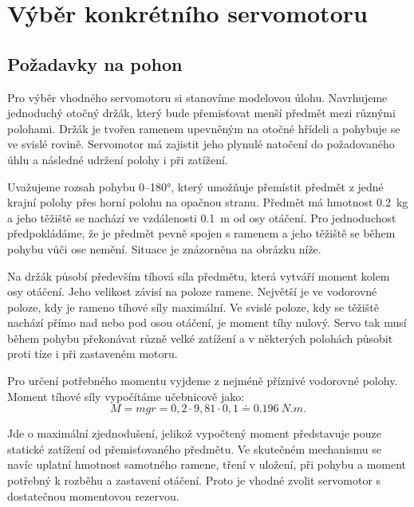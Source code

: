 
\chapter{Výběr konkrétního servomotoru}

\section{Požadavky na pohon}

Pro výběr vhodného servomotoru si stanovíme modelovou úlohu. Navrhujeme jednoduchý otočný držák, který bude přemisťovat menší předmět mezi různými polohami. Držák je tvořen ramenem upevněným na otočné hřídeli a pohybuje se ve svislé rovině. Servomotor má zajistit jeho plynulé natočení do požadovaného úhlu a následné udržení polohy i při zatížení.

Uvažujeme rozsah pohybu 0--180°, který umožňuje přemístit předmět z jedné krajní polohy přes horní polohu na opačnou stranu. Předmět má hmotnost \SI{0.2}{kg} a jeho těžiště se nachází ve vzdálenosti \SI{0.1}{m} od osy otáčení. Pro jednoduchost předpokládáme, že je předmět pevně spojen s ramenem a jeho těžiště se během pohybu vůči ose nemění. Situace je znázorněna na obrázku níže.

\vspace{5mm}

\noindent\begin{minipage}{\textwidth}\centering
\resizebox{!}{48mm}{}
\captionsetup{hypcap=false}
\label{fig:drzak}
\end{minipage}

Na držák působí především tíhová síla předmětu, která vytváří moment kolem osy otáčení. Jeho velikost závisí na poloze ramene. Největší je ve vodorovné poloze, kdy je rameno tíhové síly maximální. Ve svislé poloze, kdy se těžiště nachází přímo nad nebo pod osou otáčení, je moment tíhy nulový. Servo tak musí během pohybu překonávat různě velké zatížení a v některých polohách působit proti tíze i při zastaveném motoru.

Pro určení potřebného momentu vyjdeme z nejméně příznivé vodorovné polohy. Moment tíhové síly vypočítáme učebnicově jako:
\begin{equation}
 M=mgr=0{,}2\cdot9{,}81\cdot0{,}1
 \doteq\SI{0.196}{N.m}.
\end{equation}

Jde o maximální zjednodušení, jelikož vypočtený moment představuje pouze statické zatížení od přemisťovaného předmětu. Ve skutečném mechanismu se navíc uplatní hmotnost samotného ramene, tření v uložení, při pohybu a moment potřebný k rozběhu a zastavení otáčení. Proto je vhodné zvolit servomotor s dostatečnou momentovou rezervou.

